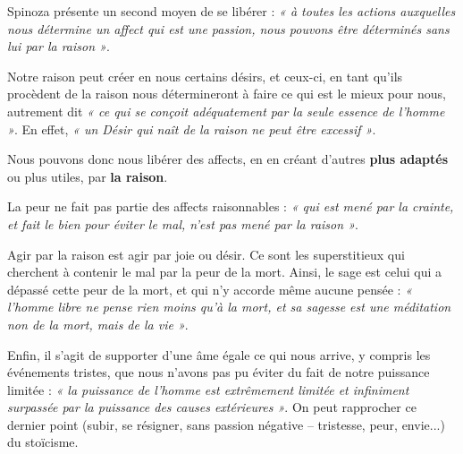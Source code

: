 \vspace{0.5cm}
Spinoza présente un second moyen de se libérer : {\it « à toutes les actions
auxquelles nous détermine un affect qui est une passion, nous pouvons être
déterminés sans lui par la raison »}.

Notre raison peut créer en nous certains désirs, et ceux-ci, en tant qu’ils
procèdent de la raison nous détermineront à faire ce qui est le mieux pour
nous, autrement dit {\it « ce qui se conçoit adéquatement par la seule essence de
l’homme »}. En effet, {\it « un Désir qui naît de la raison ne peut être excessif »}.

Nous pouvons donc nous libérer des affects, en en créant d’autres {\bf plus adaptés}
ou plus utiles, par {\bf la raison}.

\vspace{0.5cm}
La peur ne fait pas partie des affects raisonnables : {\it « qui est mené par la
crainte, et fait le bien pour éviter le mal, n’est pas mené par la raison »}.

Agir par la raison est agir par joie ou désir. Ce sont les superstitieux qui
cherchent à contenir le mal par la peur de la mort. Ainsi, le sage est celui
qui a dépassé cette peur de la mort, et qui n’y accorde même aucune pensée :
{\it « l’homme libre ne pense rien moins qu’à la mort, et sa sagesse est une
méditation non de la mort, mais de la vie »}.

Enfin, il s’agit de supporter d’une âme égale ce qui nous arrive, y compris
les événements tristes, que nous n’avons pas pu éviter du fait de notre
puissance limitée : {\it « la puissance de l’homme est extrêmement limitée et
infiniment surpassée par la puissance des causes extérieures »}. On peut
rapprocher ce dernier point (subir, se résigner, sans passion négative –
tristesse, peur, envie...) du stoïcisme.


